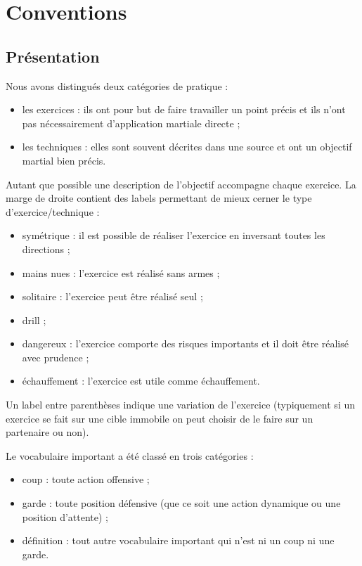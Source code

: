 \chapter{Conventions}
\label{app:conventions}


\section{Présentation}


\noindent
Nous avons distingués deux catégories de pratique :
\begin{itemize}
	\item les exercices : ils ont pour but de faire travailler un point précis et ils n'ont pas nécessairement d'application martiale directe ;
	\item les techniques : elles sont souvent décrites dans une source et ont un objectif martial bien précis.
\end{itemize}
Autant que possible une description de l'objectif accompagne chaque exercice.
La marge de droite contient des labels permettant de mieux cerner le type d'exercice/technique :
\begin{itemize}
	\item symétrique : il est possible de réaliser l'exercice en inversant toutes les directions ;
	\item mains nues : l'exercice est réalisé sans armes ;
	\item solitaire : l'exercice peut être réalisé seul ;
	\item drill ;
	\item dangereux : l'exercice comporte des risques importants et il doit être réalisé avec prudence ;
	\item échauffement : l'exercice est utile comme échauffement.
\end{itemize}
Un label entre parenthèses indique une variation de l'exercice (typiquement si un exercice se fait sur une cible immobile on peut choisir de le faire sur un partenaire ou non).

Le vocabulaire important a été classé en trois catégories :
\begin{itemize}
	\item coup : toute action offensive ;
	\item garde : toute position défensive (que ce soit une action dynamique ou une position d'attente) ;
	\item définition : tout autre vocabulaire important qui n'est ni un coup ni une garde.
\end{itemize}


